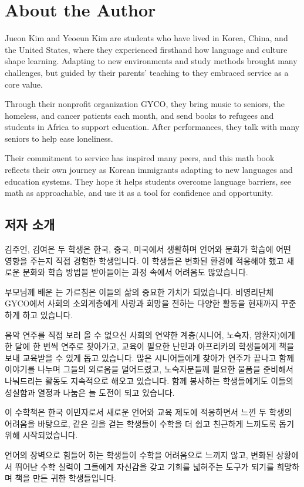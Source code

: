 \newpage
\section*{About the Author}
Jueon Kim and Yeoeun Kim are students who have lived in Korea, China, and the 
United States, where they experienced firsthand how language and culture shape 
learning. Adapting to new environments and study methods brought many challenges, 
but guided by their parents' teaching to  
they embraced service as a core value.

Through their nonprofit organization GYCO, they bring music to seniors, the 
homeless, and cancer patients each month, and send books to refugees and students 
in Africa to support education. After performances, they talk with many seniors 
to help ease loneliness.

Their commitment to service has inspired many peers, and this math book reflects 
their own journey as Korean immigrants adapting to new languages and education 
systems. They hope it helps students overcome language barriers, see math as 
approachable, and use it as a tool for confidence and opportunity.

\subsection*{저자 소개}
김주언, 김여은 두 학생은 한국, 중국, 미국에서 생활하며 언어와 문화가 학습에 어떤 
영향을 주는지 직접 경험한 학생입니다. 이 학생들은 변화된 환경에 적응해야 했고 새로운 
문화와 학습 방법을 받아들이는 과정 속에서 어려움도 많았습니다.

부모님께 배운 는 가르침은 이들의 삶의 중요한 
가치가 되었습니다. 비영리단체 GYCO에서 사회의 소외계층에게 사랑과 희망을 전하는 다양한 
활동을 현재까지 꾸준하게 하고 있습니다.

음악 연주를 직접 보러 올 수 없으신 사회의 연약한 계층(시니어, 노숙자, 암환자)에게 한 
달에 한 번씩 연주로 찾아가고, 교육이 필요한 난민과 아프리카의 학생들에게 책을 보내 
교육받을 수 있게 돕고 있습니다. 많은 시니어들에게 찾아가 연주가 끝나고 함께 이야기를 
나누며 그들의 외로움을 덜어드렸고, 노숙자분들께 필요한 물품을 준비해서 나눠드리는 활동도 
지속적으로 해오고 있습니다. 함께 봉사하는 학생들에게도 이들의 성실함과 열정과 나눔은 늘 
도전이 되고 있습니다.

이 수학책은 한국 이민자로서 새로운 언어와 교육 제도에 적응하면서 느낀 두 학생의 어려움을 
바탕으로, 같은 길을 걷는 학생들이 수학을 더 쉽고 친근하게 느끼도록 돕기 위해 시작되었습니다.

언어의 장벽으로 힘들어 하는 학생들이 수학을 어려움으로 느끼지 않고, 변화된 상황에서 뛰어난 
수학 실력이 그들에게 자신감을 갖고 기회를 넓혀주는 도구가 되기를 희망하며 책을 만든 
귀한 학생들입니다.